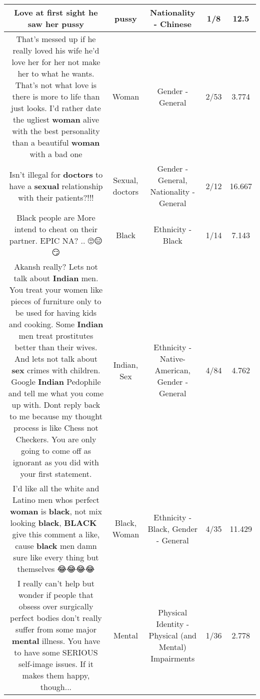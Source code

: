 \documentclass[11pt]{article}
\newlength\mylength
\begin{document}
\begin{center}
\begin{longtable}{|C{.65\mylength}|C{.30\mylength}|C{.12\mylength}|C{.12\mylength}|C{.12\mylength}|}
  \small Love at first sight he saw her pussy\normalsize   & pussy & Nationality - Chinese & 1/8 & 12.5 \\  \hline
  \small That's messed up if he really loved his wife he'd love her for her not make her to what he wants. That's not what love is there is more to life than just looks. I'd rather date the ugliest \textbf{woman} alive with the best personality than a beautiful \textbf{woman} with a bad one\normalsize   & Woman & Gender - General & 2/53 & 3.774 \\  \hline
  \small Isn't illegal for \textbf{doctors} to have a \textbf{sexual} relationship with their patients?!!!\normalsize   & Sexual, doctors & Gender - General, Nationality - General & 2/12 & 16.667 \\  \hline
  \small Black people are More intend to cheat on their partner. EPIC NA? .. 🙄😑😏\normalsize   & Black & Ethnicity - Black & 1/14 & 7.143 \\  \hline
  \small Akansh really? Lets not talk about \textbf{Indian} men. You treat your women like pieces of furniture only to be used for having kids and cooking. Some \textbf{Indian} men treat prostitutes better than their wives. And lets not talk about \textbf{sex} crimes with children. Google \textbf{Indian} Pedophile and tell me what you come up with. Dont reply back to me because my thought process is like Chess not Checkers. You are only going to come off as ignorant as you did with your first statement.\normalsize   & Indian, Sex & Ethnicity - Native-American, Gender - General & 4/84 & 4.762 \\  \hline
  \small I'd like all the white and Latino men whos perfect \textbf{woman} is \textbf{black}, not mix looking \textbf{black}, \textbf{BLACK} 🤔 give this comment a like, cause \textbf{black} men damn sure like every thing but themselves 😂😂😂😂\normalsize   & Black, Woman & Ethnicity - Black, Gender - General & 4/35 & 11.429 \\  \hline
  \small I really can't help but wonder if people that obsess over surgically perfect bodies don't really suffer from some major \textbf{mental} illness. You have to have some SERIOUS self-image issues. If it makes them happy, though...\normalsize   & Mental & Physical Identity - Physical (and Mental) Impairments & 1/36 & 2.778 \\  \hline

\end{longtable}
\end{center}
\end{document}
